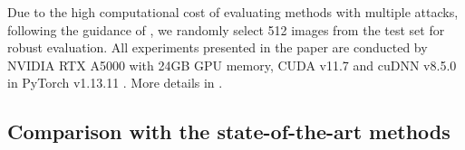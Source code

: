 
Due to the high computational cost of evaluating methods with multiple attacks, following the guidance of \citet{nie2022diffusion}, we randomly select 512 images from the test set for robust evaluation. All experiments presented in the paper are conducted by NVIDIA RTX A5000 with 24GB GPU memory, CUDA v11.7 and cuDNN v8.5.0 in PyTorch v1.13.11 \citep{paszke2019pytorch}. More details in .

\subsection{Comparison with the state-of-the-art methods}
\label{Comparison results}


